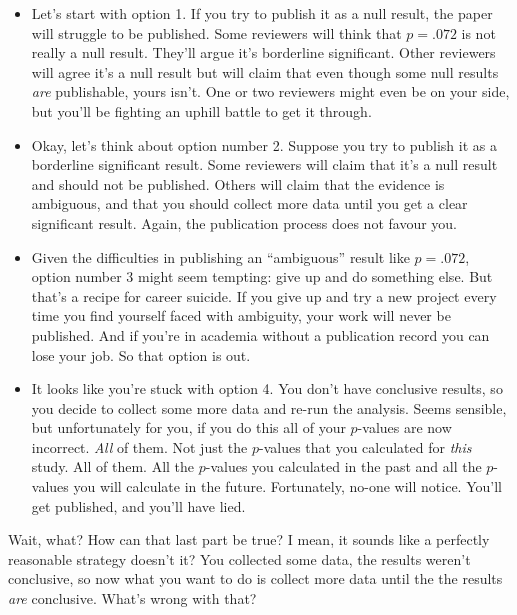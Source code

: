 \begin{itemize}
\item Let's start with option 1. If you try to publish it as a null result, the paper will struggle to be published. Some reviewers will think that $p=.072$ is not really a null result. They'll argue it's borderline significant. Other reviewers will agree it's a null result but will claim that even though some null results {\it are} publishable, yours isn't. One or two reviewers might even be on your side, but you'll be fighting an uphill battle to get it through.

\item Okay, let's think about option number 2. Suppose you try to publish it as a borderline significant result. Some reviewers will claim that it's a null result and should not be published. Others will claim that the evidence is ambiguous, and that you should collect more data until you get a clear significant result. Again, the publication process does not favour you.

\item Given the difficulties in publishing an ``ambiguous'' result like $p=.072$, option number 3 might seem tempting: give up and do something else. But that's a recipe for career suicide. If you give up and try a new project every time you find yourself faced with ambiguity, your work will never be published. And if you're in academia without a publication record you can lose your job. So that option is out.

\item It looks like you're stuck with option 4. You don't have conclusive results, so you decide to collect some more data and re-run the analysis. Seems sensible, but unfortunately for you, if you do this all of your $p$-values are now incorrect. {\it All} of them. Not just the $p$-values that you calculated for {\it this} study. All of them. All the $p$-values you calculated in the past and all the $p$-values you will calculate in the future. Fortunately, no-one will notice. You'll get published, and you'll have lied.

\end{itemize}

\noindent
Wait, what? How can that last part be true? I mean, it sounds like a perfectly reasonable strategy doesn't it? You collected some data, the results weren't conclusive, so now what you want to do is collect more data until the the results {\it are} conclusive. What's wrong with that?

